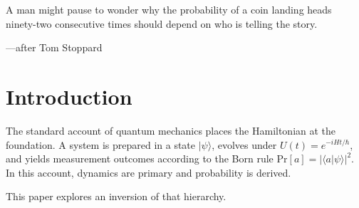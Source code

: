 \documentclass[12pt,a4paper]{article}
\theoremstyle{definition}
\theoremstyle{remark}
\newcommand{\ket}[1]{|#1\rangle}
\newcommand{\braket}[2]{\langle#1|#2\rangle}
\newcommand{\Prob}{\mathrm{Pr}}
\begin{document}
\begin{abstract}
We state this conjecture in three forms of increasing strength
(from deployed LLMs under prompting, through transformer
architectures in general, to all autoregressive processes) and
design an experimental program to discriminate among them.  The
central discriminant is a \emph{causal-injection test}: independent
combinatorial systems, framed as a narrative sequence, are tested
for spurious cross-system correlations that would indicate the
substrate is generating causal structure not present in the
underlying task.

If the conjecture holds even in its moderate form, it has
implications beyond machine learning.  We develop a speculative
but falsifiable framework in which the Born rule is the base case
of a fundamentally autoregressive reality, and the
Hamiltonian is an emergent compression of stable autoregressive
conditioning patterns.  On this view, a purely quantum
world---one with no Hamiltonian, no dynamics, no causality---is
one in which no autoregressive conditioning has yet imposed
sequential structure on the event space.

We present concrete falsifiable predictions, propose an
experimental program to test them, and delineate where the
argument transitions from formal result to empirical conjecture
to philosophical speculation.
\end{abstract}

\vspace{1em}
\epigraph{%
  A man might pause to wonder why the probability of a coin
  landing heads ninety-two consecutive times should depend
  on who is telling the story.%
}{---after Tom Stoppard}


\section{Introduction}
\label{sec:intro}

The standard account of quantum mechanics places the Hamiltonian at
the foundation.  A system is prepared in a state $\ket{\psi}$,
evolves under $U(t) = e^{-iHt/\hbar}$, and yields measurement
outcomes according to the Born rule $\Prob[a] = |\braket{a}{\psi}|^2$.
In this account, dynamics are primary and probability is derived.

This paper explores an inversion of that hierarchy.
\end{document}
